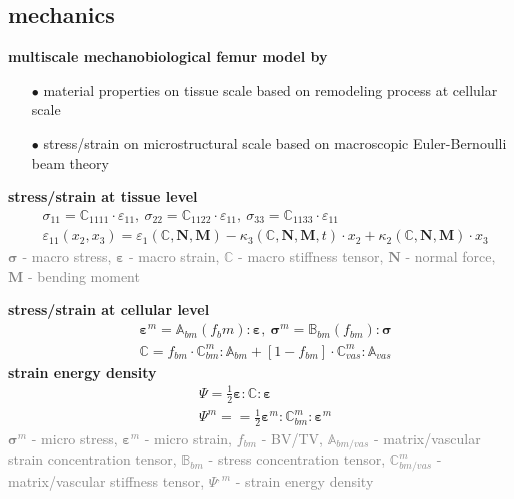 \documentclass[%
aspectratio=169,  %
]{beamer}
\begin{document}
\subsection{mechanics}
\begin{frame}
\textbf{multiscale mechanobiological femur model by \cite{Lerebours.2016}}
\begin{itemize}
\item [$\bullet$] material properties on tissue scale based on remodeling process at cellular scale
\item[$\bullet$] stress/strain on microstructural scale based on macroscopic Euler-Bernoulli beam theory
\end{itemize}
\textbf{stress/strain at tissue level}
\begin{align}
&\sigma_{11} = \mathbb{C}_{1111} \cdot\varepsilon_{11},~ \sigma_{22} = \mathbb{C}_{1122} \cdot \varepsilon_{11},~ \sigma_{33} = \mathbb{C}_{1133} \cdot \varepsilon_{11} \\
&\varepsilon_{11} (x_2, x_3) = \varepsilon_1(\mathbb{C}, \mathbf{N}, \mathbf{M}) - \kappa_3(\mathbb{C}, \mathbf{N}, \mathbf{M},t) \cdot x_2 + \kappa_2(\mathbb{C}, \mathbf{N}, \mathbf{M}) \cdot x_3
\end{align}
\textcolor{gray}{$\bm{\sigma}$ - macro stress, $\bm{\varepsilon}$ - macro strain, $\mathbb{C}$ - macro stiffness tensor, $\mathbf{N}$ - normal force, $\mathbf{M}$ - bending moment }
\end{frame}

\begin{frame}
\textbf{stress/strain at cellular level}
\begin{align}
&\bm{\varepsilon}^m = \mathbb{A}_{bm}(f_bm) :  \bm{\varepsilon},~ \bm{\sigma}^m = \mathbb{B}_{bm}(f_{bm}) :  \bm{\sigma} \\
&\mathbb{C} = f_{bm} \cdot \mathbb{C}_{bm}^m : \mathbb{A}_{bm} + [1-f_{bm}] \cdot \mathbb{C}_{vas}^m : \mathbb{A}_{vas}
\end{align}
\textbf{strain energy density}
\begin{align}
& \Psi = \frac{1}{2} \bm{\varepsilon} : \mathbb{C} :  \bm{\varepsilon}  \\
& \Psi^m = = \frac{1}{2} \bm{\varepsilon}^m : \mathbb{C}^m_{bm} :  \bm{\varepsilon} ^m
\end{align}
\textcolor{gray}{$\bm{\sigma}^m$ - micro stress, $\bm{\varepsilon}^m$ - micro strain, $f_{bm}$ - BV/TV,  $\mathbb{A}_{bm/vas}$ - matrix/vascular strain concentration tensor, $\mathbb{B}_{bm}$ - stress concentration tensor, 
						$\mathbb{C}_{bm/vas}^m$ - matrix/vascular stiffness tensor, $\Psi^{,m}$ - strain energy density}
\end{frame}
\end{document}
